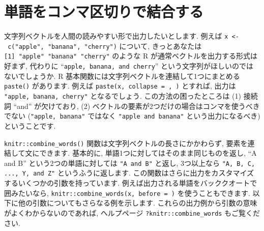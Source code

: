 \documentclass[
  11pt,
  lualatex,
  ja=standard]{bxjsreport}
\begin{document}
\hypertarget{combine-words}{%
\section{単語をコンマ区切りで結合する}\label{combine-words}}

文字列ベクトルを人間の読みやすい形で出力したいとします. 例えば \texttt{x \textless{}-\ c("apple",\ "banana",\ "cherry")} について, きっとあなたは \texttt{{[}1{]}\ "apple"\ "banana"\ "cherry"} のような R が通常ベクトルを出力する形式は好まず, 代わりに ``\texttt{apple, banana, and cherry}'' という文字列がほしいのではないでしょうか. R 基本関数には文字列ベクトルを連結して1つにまとめる \texttt{paste()} があります. 例えば \texttt{paste(x, collapse = \textquotesingle{},\ \textquotesingle{})} とすれば, 出力は \texttt{"apple, banana, cherry"} となるでしょう. この方法の困ったところは (1) 接続詞 ``and'' が欠けており, (2) ベクトルの要素が2つだけの場合はコンマを使うべきでない (\texttt{"apple, banana"} ではなく \texttt{"apple and banana"} という出力になるべき) ということです.

\texttt{knitr::combine\_words()} 関数は文字列ベクトルの長さにかかわらず, 要素を連結して文にできます. 基本的に, 単語1つに対してはそのまま同じものを返し, ``A and B'' という2つの単語に対しては \texttt{"A and B"} と返し, 3つ以上なら \texttt{"A, B, C, ..., Y, and Z"} というふうに返します. この関数はさらに出力をカスタマイズするいくつかの引数を持っています. 例えば出力される単語をバッククオートで囲みたいなら, \texttt{knitr::combine\_words(x, before = \textquotesingle{}\textasciigrave{}\textquotesingle{})} を使うこともできます. 以下に他の引数についてもさらなる例を示します. これらの出力例から引数の意味がよくわからないのであれば, ヘルプページ \texttt{?knitr::combine\_words} もご覧ください.
\end{document}
